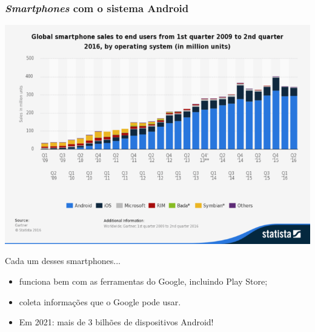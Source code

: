 \documentclass[xcolor=dvipsnames]{beamer}
\begin{document}
\begin{frame}
	\frametitle{\textit{Smartphones} com o sistema Android}
 	\includegraphics[scale=0.30]{android.png}
\pause
	{\footnotesize 
	\begin{block}{Cada um desses smartphones...}	
	\begin{itemize}
	\item funciona bem com as ferramentas do Google, incluindo Play Store;
	\item coleta informações que o Google pode usar.
	\item Em 2021: mais de 3 bilhões de dispositivos Android!
	\end{itemize}
	\end{block}}
\end{frame}
\end{document}
